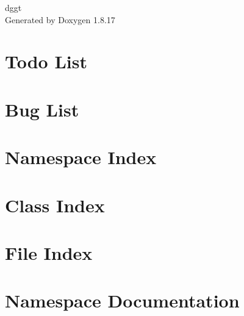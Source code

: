 \let\mypdfximage\pdfximage\def\pdfximage{\immediate\mypdfximage}\documentclass[twoside]{book}
\newcommand{\+}{\discretionary{\mbox{\scriptsize$\hookleftarrow$}}{}{}}
\newcommand{\clearemptydoublepage}{%
  \newpage{\pagestyle{empty}\cleardoublepage}%
}
\begin{document}
\hypersetup{pageanchor=false,
             bookmarksnumbered=true,
             pdfencoding=unicode
            }
\begin{titlepage}
\vspace*{7cm}
\begin{center}%
{\Large dggt }\\
\vspace*{1cm}
{\large Generated by Doxygen 1.8.17}\\
\end{center}
\end{titlepage}
\clearemptydoublepage
{}
\tableofcontents
\clearemptydoublepage
{}
\hypersetup{pageanchor=true}

\chapter{Todo List}
\label{todo}

\chapter{Bug List}
\label{bug}

\chapter{Namespace Index}

\chapter{Class Index}

\chapter{File Index}

\chapter{Namespace Documentation}

\end{document}
